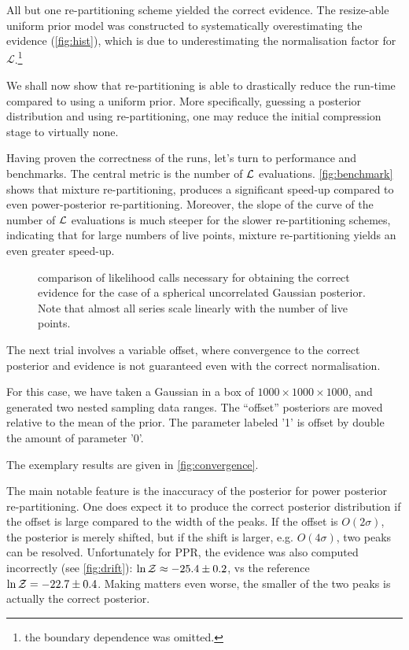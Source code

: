 \documentclass[usenatbib]{mnras}
\begin{document}
All but one re-partitioning scheme yielded the correct
evidence. The resize-able uniform prior model was constructed to
systematically overestimating the evidence (\autoref{fig:hist}),
which is due to underestimating the normalisation factor for
\(\mathcal{L}\).\footnote{the boundary dependence was omitted.}


We shall now show that re-partitioning is able to drastically reduce
the run-time compared to using a uniform prior. More specifically,
guessing a posterior distribution and using re-partitioning, one may
reduce the initial compression stage to virtually none.

Having proven the correctness of the runs, let's turn to performance
and benchmarks. The central metric is the number of \({\cal L}\)
evaluations. \autoref{fig:benchmark} shows that mixture
re-partitioning, produces a significant speed-up compared to even
power-posterior re-partitioning. Moreover, the slope of the curve of
the number of \({\cal L}\) evaluations is much steeper for the slower
re-partitioning schemes, indicating that for large numbers of live
points, mixture re-partitioning yields an even greater speed-up.



\begin{figure}
  
\caption{\label{orgb9a35af}
comparison of likelihood calls necessary for obtaining the correct evidence for the case of a spherical uncorrelated Gaussian posterior. Note that almost all series scale linearly with the number of live points.}
\end{figure}




The next trial involves a variable offset, where convergence to the
correct posterior and evidence is not guaranteed even with the
correct normalisation.    

For this case, we have taken a Gaussian in a box of
\(1000\times1000\times1000\), and generated two nested sampling data
ranges. The ``offset'' posteriors are moved relative to the mean of
the prior. The parameter labeled '1' is offset by double the amount
of parameter '0'. 

The exemplary results are given in \autoref{fig:convergence}.

The main notable feature is the inaccuracy of the posterior for
power posterior re-partitioning. One does expect it to produce the
correct posterior distribution if the offset is large compared to
the width of the peaks. If the offset is \(O(2\sigma)\), the
posterior is merely shifted, but if the shift is larger,
e.g. \(O(4\sigma)\), two peaks can be resolved. Unfortunately for
PPR, the evidence was also computed incorrectly (see
\autoref{fig:drift}): \(\ln {\cal Z}\approx -25.4 \pm 0.2\), vs the
reference \(\ln {\cal Z} = -22.7 \pm 0.4\).  Making matters even
worse, the smaller of the two peaks is actually the correct
posterior.
\end{document}
